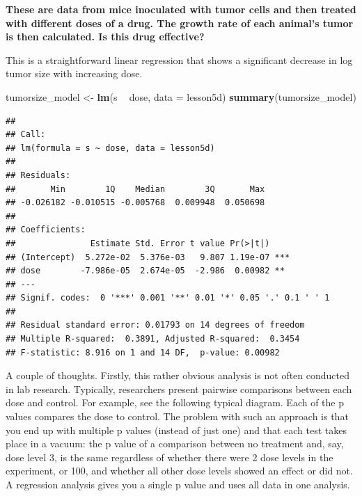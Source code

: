 \documentclass[]{book}
\newenvironment{Shaded}{\begin{snugshade}}{\end{snugshade}}
\newcommand{\DataTypeTok}[1]{\textcolor[rgb]{0.13,0.29,0.53}{#1}}
\newcommand{\KeywordTok}[1]{\textcolor[rgb]{0.13,0.29,0.53}{\textbf{#1}}}
\newcommand{\NormalTok}[1]{#1}
\newcommand{\OperatorTok}[1]{\textcolor[rgb]{0.81,0.36,0.00}{\textbf{#1}}}
\newcommand{\StringTok}[1]{\textcolor[rgb]{0.31,0.60,0.02}{#1}}
\begin{document}
\textbf{These are data from mice inoculated with tumor cells and then treated with different doses of a drug. The growth rate of each animal's tumor is then calculated. Is this drug effective?}

This is a straightforward linear regression that shows a significant decrease in log tumor size with increasing dose.

\begin{Shaded}
\begin{Highlighting}[]
\NormalTok{tumorsize_model <-}\StringTok{ }\KeywordTok{lm}\NormalTok{(s }\OperatorTok{~}\StringTok{ }\NormalTok{dose, }\DataTypeTok{data =}\NormalTok{ lesson5d)}
\KeywordTok{summary}\NormalTok{(tumorsize_model)}
\end{Highlighting}
\end{Shaded}

\begin{verbatim}
## 
## Call:
## lm(formula = s ~ dose, data = lesson5d)
## 
## Residuals:
##       Min        1Q    Median        3Q       Max 
## -0.026182 -0.010515 -0.005768  0.009948  0.050698 
## 
## Coefficients:
##               Estimate Std. Error t value Pr(>|t|)    
## (Intercept)  5.272e-02  5.376e-03   9.807 1.19e-07 ***
## dose        -7.986e-05  2.674e-05  -2.986  0.00982 ** 
## ---
## Signif. codes:  0 '***' 0.001 '**' 0.01 '*' 0.05 '.' 0.1 ' ' 1
## 
## Residual standard error: 0.01793 on 14 degrees of freedom
## Multiple R-squared:  0.3891, Adjusted R-squared:  0.3454 
## F-statistic: 8.916 on 1 and 14 DF,  p-value: 0.00982
\end{verbatim}

A couple of thoughts. Firstly, this rather obvious analysis is not often conducted in lab research. Typically, researchers present pairwise comparisons between each dose and control. For example, see the following typical diagram. Each of the p values compares the dose to control. The problem with such an approach is that you end up with multiple p values (instead of just one) and that each test takes place in a vacuum: the p value of a comparison between no treatment and, say, dose level 3, is the same regardless of whether there were 2 dose levels in the experiment, or 100, and whether all other dose levels showed an effect or did not. A regression analysis gives you a single p value and uses all data in one analysis.
\end{document}
